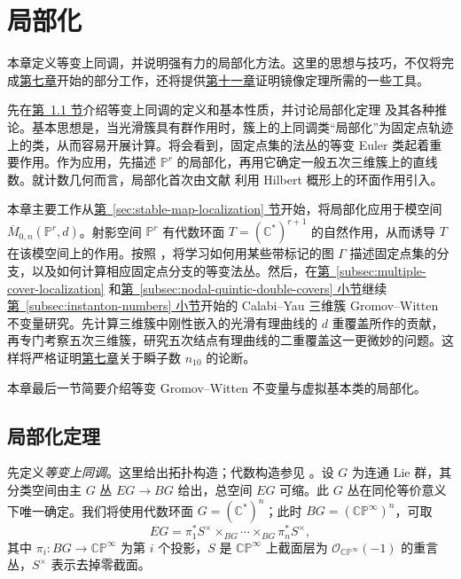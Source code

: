 \chapter{局部化}\label{chap:localization}
本章定义等变上同调，并说明强有力的局部化方法。这里的思想与技巧，不仅将完成\hyperref[chap:gromov-witten]{第七章}开始的部分工作，还将提供\hyperref[chap:mirror-theorem]{第十一章}证明镜像定理所需的一些工具。

先在\hyperref[sec:localization-theorem]{第~\ref*{sec:localization-theorem} 节}介绍等变上同调的定义和基本性质，并讨论局部化定理  及其各种推论。基本思想是，当光滑簇具有群作用时，簇上的上同调类“局部化”为固定点轨迹上的类，从而容易开展计算。将会看到，固定点集的法丛的等变 Euler 类起着重要作用。作为应用，先描述 $\mathbb P^r$ 的局部化，再用它确定一般五次三维簇上的直线数。就计数几何而言，局部化首次由文献  利用 Hilbert 概形上的环面作用引入。

本章主要工作从\hyperref[sec:stable-map-localization]{第~\ref*{sec:stable-map-localization} 节}开始，将局部化应用于模空间 $\overline M_{0,n}(\mathbb P^r,d)$。射影空间 $\mathbb P^r$ 有代数环面 $T=(\mathbb C^*)^{r+1}$ 的自然作用，从而诱导 $T$ 在该模空间上的作用。按照 ，将学习如何用某些带标记的图 $\Gamma$ 描述固定点集的分支，以及如何计算相应固定点分支的等变法丛。然后，在\hyperref[subsec:multiple-cover-localization]{第~\ref*{subsec:multiple-cover-localization}} 和\hyperref[subsec:nodal-quintic-double-covers]{第~\ref*{subsec:nodal-quintic-double-covers} 小节}继续\hyperref[subsec:instanton-numbers]{第~\ref*{subsec:instanton-numbers} 小节}开始的 Calabi--Yau 三维簇 Gromov--Witten 不变量研究。先计算三维簇中刚性嵌入的光滑有理曲线的 $d$ 重覆盖所作的贡献，再专门考察五次三维簇，研究五次结点有理曲线的二重覆盖这一更微妙的问题。这样将严格证明\hyperref[chap:gromov-witten]{第七章}关于瞬子数 $n_{10}$ 的论断。

本章最后一节简要介绍等变 Gromov--Witten 不变量与虚拟基本类的局部化。

\section{局部化定理}\label{sec:localization-theorem}
先定义\emph{等变上同调}。这里给出拓扑构造；代数构造参见 。设 $G$ 为连通 Lie 群，其分类空间由主 $G$ 丛 $EG\to BG$ 给出，总空间 $EG$ 可缩。此 $G$ 丛在同伦等价意义下唯一确定。我们将使用代数环面 $G=(\mathbb C^*)^n$；此时 $BG=(\mathbb{CP}^\infty)^n$，可取
\[
EG=\pi_1^*S^\times\times_{BG}\cdots\times_{BG}\pi_n^*S^\times,
\]
其中 $\pi_i:BG\to\mathbb{CP}^\infty$ 为第 $i$ 个投影，$S$ 是 $\mathbb{CP}^\infty$ 上截面层为 $\mathcal O_{\mathbb{CP}^\infty}(-1)$ 的重言丛，$S^\times$ 表示去掉零截面。
